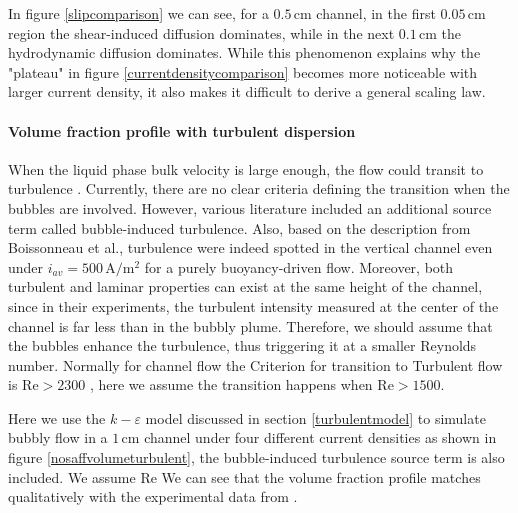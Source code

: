 In figure \ref{slipcomparison} we can see, for a $0.5 \,\mathrm{cm}$ channel, in the first $0.05 \, \mathrm{cm}$ region the shear-induced diffusion dominates, while in the next $0.1 \,\mathrm{cm}$ the hydrodynamic diffusion dominates. While this phenomenon explains why the "plateau" in figure \ref{currentdensitycomparison} becomes more noticeable with larger current density, it also makes it difficult to derive a general scaling law.

\paragraph{Volume fraction profile with turbulent dispersion}
\*

When the liquid phase bulk velocity is large enough, the flow could transit to turbulence \cite{Boissonneau2000}. Currently, there are no clear criteria defining the transition when the bubbles are involved. However, various literature \cite{Rzehak2013, Sokolichin2004} included an additional source term called bubble-induced turbulence. Also, based on the description from Boissonneau et al.\cite{Boissonneau2000}, turbulence were indeed spotted in the vertical channel even under $i_{av} = 500 \, \mathrm{A/m^2}$ for a purely buoyancy-driven flow. Moreover, both turbulent and laminar properties can exist at the same height of the channel, since in their experiments, the turbulent intensity measured at the center of the channel is far less than in the bubbly plume. Therefore, we should assume that the bubbles enhance the turbulence, thus triggering it at a smaller Reynolds number. Normally for channel flow the Criterion for transition to Turbulent flow is $\mathrm{Re}>2300$ \cite{pope2001turbulent}, here we assume the transition happens when $\mathrm{Re}>1500$. 

Here we use the $k-\varepsilon$ model discussed in section \ref{turbulentmodel} to simulate bubbly flow in a $1 \, \mathrm{cm}$ channel under four different current densities as shown in figure \ref{nosaffvolumeturbulent}, the bubble-induced turbulence source term is also included. We assume $\mathrm{Re}$ We can see that the volume fraction profile matches qualitatively with the experimental data from \cite{riegel1998role}.


